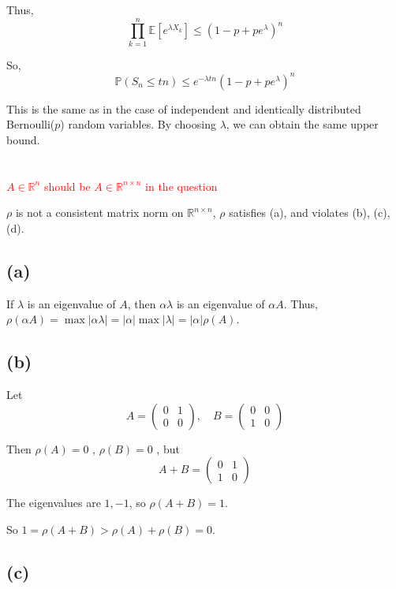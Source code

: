 \documentclass{article}
\begin{document}
Thus,
$$
\prod_{k = 1}^n\mathbb{E}[e^{\lambda X_k}]\leq(1 - p + pe^{\lambda})^n
$$

So,
$$
\mathbb{P}(S_n\leq tn)\leq e^{-\lambda tn}(1 - p + pe^{\lambda})^n
$$

This is the same as in the case of independent and identically distributed Bernoulli($ p $) random variables. By choosing $ \lambda $, we can obtain the same upper bound.

\section{}
\textcolor{red}{$A \in \mathbb{R}^{n}$ should be $A \in \mathbb{R}^{n\times n}$ in the question}

$\rho$ is not a consistent matrix norm on $\mathbb{R}^{n\times n}$, $\rho$ satisfies (a), and violates (b), (c), (d).

\subsection*{(a)}

 If $ \lambda $ is an eigenvalue of $ A $, then $ \alpha\lambda $ is an eigenvalue of $ \alpha A $. Thus, $ \rho(\alpha A)=\max|\alpha\lambda| = |\alpha|\max|\lambda|=|\alpha|\rho(A) $.

\subsection*{(b)}

Let
$$
A=\begin{pmatrix}0&1\\0&0\end{pmatrix}, \quad B=\begin{pmatrix}0&0\\1&0\end{pmatrix}
$$

Then $ \rho(A) = 0 $ , $ \rho(B)=0 $ , but
$$
A + B=\begin{pmatrix}0&1\\1&0\end{pmatrix}
$$

The eigenvalues are $ 1, - 1 $, so $ \rho(A + B)=1 $.

So $ 1=\rho(A + B)>\rho(A)+\rho(B)= 0 $.

\subsection*{(c)}
\end{document}
